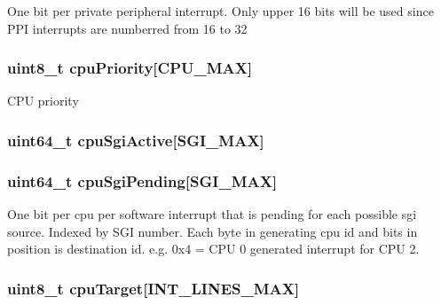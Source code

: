 \label{classPl390_a301af4f8223a97310920fc36160fb26d}
One bit per private peripheral interrupt. Only upper 16 bits will be used since PPI interrupts are numberred from 16 to 32 \hypertarget{classPl390_a8d3092e01e51b8ee0dd9787a9e44b795}{
\subsubsection[{cpuPriority}]{\setlength{\rightskip}{0pt plus 5cm}uint8\_\-t {\bf cpuPriority}\mbox{[}{\bf CPU\_\-MAX}\mbox{]}}}
\label{classPl390_a8d3092e01e51b8ee0dd9787a9e44b795}
CPU priority \hypertarget{classPl390_aa8be2dd249b8372cdddb56197778b7a8}{
\subsubsection[{cpuSgiActive}]{\setlength{\rightskip}{0pt plus 5cm}uint64\_\-t {\bf cpuSgiActive}\mbox{[}{\bf SGI\_\-MAX}\mbox{]}}}
\label{classPl390_aa8be2dd249b8372cdddb56197778b7a8}
\hypertarget{classPl390_a78fdfd8252d9d31df17bc7799f30650d}{
\subsubsection[{cpuSgiPending}]{\setlength{\rightskip}{0pt plus 5cm}uint64\_\-t {\bf cpuSgiPending}\mbox{[}{\bf SGI\_\-MAX}\mbox{]}}}
\label{classPl390_a78fdfd8252d9d31df17bc7799f30650d}
One bit per cpu per software interrupt that is pending for each possible sgi source. Indexed by SGI number. Each byte in generating cpu id and bits in position is destination id. e.g. 0x4 = CPU 0 generated interrupt for CPU 2. \hypertarget{classPl390_aedf9bee3143d433dfabe7bc84f574df6}{
\subsubsection[{cpuTarget}]{\setlength{\rightskip}{0pt plus 5cm}uint8\_\-t {\bf cpuTarget}\mbox{[}{\bf INT\_\-LINES\_\-MAX}\mbox{]}}}
